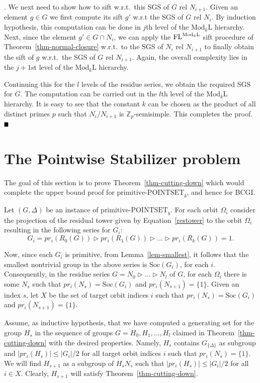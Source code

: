 \documentclass[11pt]{article}
\newcommand{\bproof}{\noindent{\it Proof}}
\newcommand{\eproof}{\hspace*{\fill}$\rule{2mm}{2mm}$~~~~~\bigskip}
\renewenvironment{proof}{\bproof. }{\eproof}
\newcommand{\Mod}[1]{\ensuremath{\mathrm{Mod}_{#1}\mathrm{L}}}
\newcommand{\FL}{\mbox{\rm FL}}
\newcommand{\Z}{\mathbb{Z}}
\newcommand{\prpsb}[1]{\ensuremath{\textrm{primitive-POINTSET}_{#1}}}
\newcommand{\Soc}[1]{\ensuremath{\mathrm{Soc}\left(#1\right)}}
\newcommand{\pr}[2]{\ensuremath{pr_{#1}\left({#2}\right)}}
\begin{document}
\begin{proof}
We next need to show how to sift w.r.t.\ this SGS of $G$ rel
$N_{i+1}$. Given an element $g \in G$ we first compute its sift $g'$
w.r.t the SGS of $G$ rel $N_i$. By induction hypothesis, this
computation can be done in $j$th level of the $\Mod{k}$ hierarchy.
Next, since the element $g'\in G\cap N_i$, we can apply the
$\FL^{\Mod{k}}$ sift procedure of Theorem~\ref{thm-normal-closure}
w.r.t.\ to the SGS of $N_i$ rel $N_{i+1}$ to finally obtain the sift
of $g$ w.r.t.\ the SGS of $G$ rel $N_{i+1}$. Again, the overall complexity
lies in the $j+1$st level of the $\Mod{k}$ hierarchy.

Continuing this for the $l$ levels of the residue series, we obtain
the required SGS for $G$. The computation can be carried out in the
$l$th level of the $\Mod{k}$ hierarchy. It is easy to see that the
constant $k$ can be chosen as the product of all distinct primes $p$
such that $N_i/N_{i+1}$ is $\Z_p$-semisimple. This completes the
proof.
\end{proof}

\section{The Pointwise Stabilizer problem}\label{six}

The goal of this section is to prove Theorem~\ref{thm-cutting-down}
which would complete the upper bound proof for $\prpsb{b}$, and hence
for BCGI.

Let $(G,\Delta)$ be an instance of $\prpsb{b}$. For each orbit
$\Omega_i$ consider the projection of the residual tower given by
Equation~\ref{restower} to the orbit $\Omega_i$ resulting in
the following series for $G_i$:
\[
G_i = \pr{i}{R_0(G)} \rhd\pr{i}{R_1(G)} \rhd \ldots \rhd
\pr{i}{R_k(G)} = 1.
\]

Now, since each $G_i$ is primitive, from Lemma~\ref{lem-smallest}, it
follows that the smallest nontrivial group in the above series is
$\Soc{G_i}$, for each $i$. Consequently, in the residue series $G =
N_0 \rhd \ldots \rhd N_l$ of $G$, for each $\Omega_i$ there is some
$N_s$ such that $\pr{i}{N_s}=\Soc{G_i}$ and
$\pr{i}{N_{s+1}}=\{1\}$. Given an index $s$, let $X$ be the set of
target orbit indices $i$ such that $\pr{i}{N_s}=\Soc{G_i}$ and
$\pr{i}{N_{s+1}}=\{1\}$.

Assume, as inductive hypothesis, that we have computed a generating
set for the group $H_s$ in the sequence of groups
$G=H_0,H_1,\ldots,H_l$ claimed in Theorem~\ref{thm-cutting-down} with
the desired properties. Namely, $H_s$ contains $G_{\{\Delta\}}$ as
subgroup and $|\pr{i}{H_s}|\leq |G_i|/2$ for all target orbit indices
$i$ such that $\pr{i}{N_s}=\{1\}$. We will find $H_{s+1}$ as a
subgroup of $H_sN_s$ such that $|\pr{i}{H_s}|\leq |G_i|/2$ for all
$i\in X$. Clearly, $H_{s+1}$ will satisfy
Theorem~\ref{thm-cutting-down}.
 
\end{document}
